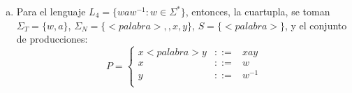 \begin{mdframed}[style = warning]
\begin{problem}
\begin{enumerate}[a)]
$$\begin{array}{ccc}
					<car2> & ::= & b \\
					\end{array}\right.
					$$
				\item Para el lenguaje $L_4 = \{ waw^{-1}: w\in \Sigma ^* \}$, entonces, la cuartupla, se toman $\Sigma _T = \{ w,a \}$, $\Sigma _N = \{ <palabra>,,x,y \}$, $S = \{ <palabra> \}$, y el conjunto de producciones:
					$$
					P = \left\{\begin{array}{ccc}
					x<palabra>y & ::= & xay \\
					x & ::= & w \\
					y & ::= & w^{-1} \\
					\end{array}\right.
					$$
			\end{enumerate}
	\end{problem}
\end{mdframed}































